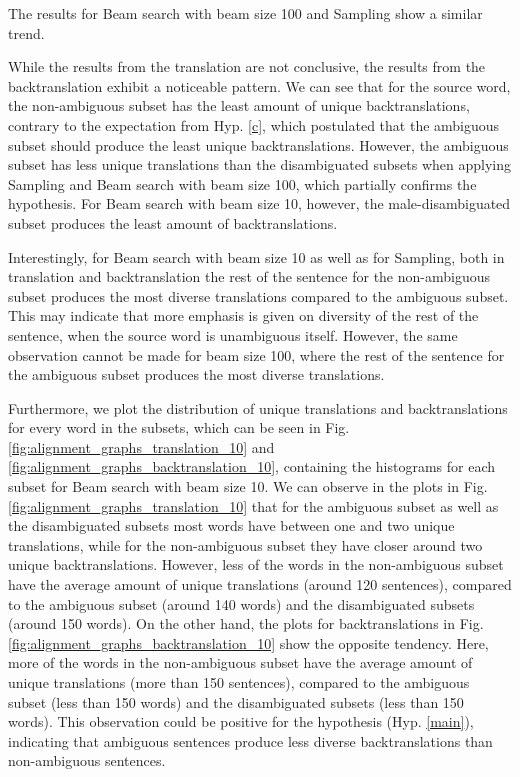The results for Beam search with beam size 100 and Sampling show a similar trend.

While the results from the translation are not conclusive, the results from the backtranslation exhibit a noticeable pattern. We can see that for the source word, the non-ambiguous subset has the least amount of unique backtranslations, contrary to the expectation from Hyp. \ref{c}, which postulated that the ambiguous subset should produce the least unique backtranslations. However, the ambiguous subset has less unique translations than the disambiguated subsets when applying Sampling and Beam search with beam size 100, which partially confirms the hypothesis. For Beam search with beam size 10, however, the male-disambiguated subset produces the least amount of backtranslations.

Interestingly, for Beam search with beam size 10 as well as for Sampling, both in translation and backtranslation the rest of the sentence for the non-ambiguous subset produces the most diverse translations compared to the ambiguous subset. This may indicate that more emphasis is given on diversity of the rest of the sentence, when the source word is unambiguous itself. However, the same observation cannot be made for beam size 100, where the rest of the sentence for the ambiguous subset produces the most diverse translations.

Furthermore, we plot the distribution of unique translations and backtranslations for every word in the subsets, which can be seen in Fig. \ref{fig:alignment_graphs_translation_10} and \ref{fig:alignment_graphs_backtranslation_10}, containing the histograms for each subset for Beam search with beam size 10. 
We can observe in the plots in Fig. \ref{fig:alignment_graphs_translation_10} that for the ambiguous subset as well as the disambiguated subsets most words have between one and two unique translations, while for the non-ambiguous subset they have closer around two unique backtranslations. However, less of the words in the non-ambiguous subset have the average amount of unique translations (around 120 sentences), compared to the ambiguous subset (around 140 words) and the disambiguated subsets (around 150 words). 
On the other hand, the plots for backtranslations in Fig. \ref{fig:alignment_graphs_backtranslation_10} show the opposite tendency. Here, more of the words in the non-ambiguous subset have the average amount of unique translations (more than 150 sentences), compared to the ambiguous subset (less than 150 words) and the disambiguated subsets (less than 150 words). This observation could be positive for the hypothesis (Hyp. \ref{main}), indicating that ambiguous sentences produce less diverse backtranslations than non-ambiguous sentences.

